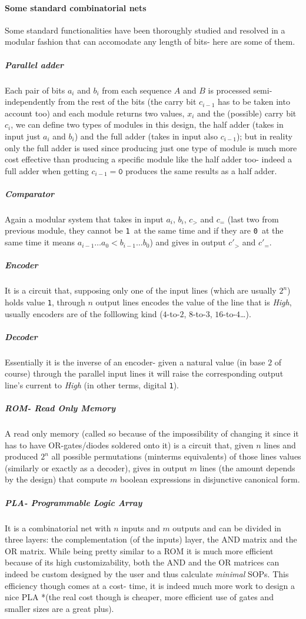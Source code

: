 \documentclass{scrartcl}
\newcommand{\zero}{\texttt{0}}
\newcommand{\one}{\texttt{1}}
\begin{document}
    \paragraph{Some standard combinatorial nets} Some standard functionalities have been thoroughly studied and resolved in a modular fashion that can accomodate any length of bits- here are some of them.
    \subparagraph{Parallel adder} Each pair of bits $a_i$ and $b_i$ from each sequence $A$ and $B$ is processed semi-independently from the rest of the bits (the carry bit $c_{i-1}$ has to be taken into account too) and each module returns two values, $x_i$ and the (possible) carry bit $c_i$, we can define two types of modules in this design, the half adder (takes in input just $a_i$ and $b_i$) and the full adder (takes in input also $c_{i-1}$); but in reality only the full adder is used since producing just one type of module is much more cost effective than producing a specific module like the half adder too- indeed a full adder when getting $c_{i-1}=\zero$ produces the same results as a half adder.
    \subparagraph{Comparator} Again a modular system that takes in input $a_i$, $b_i$, $c_{>}$ and $c_{=}$ (last two from previous module, they cannot be \one\ at the same time and if they are \zero\ at the same time it means $a_{i-1}\dots a_0 < b_{i-1}\dots b_0$) and gives in output $c'_{>}$ and $c'_{=}$.
    \subparagraph{Encoder} It is a circuit that, supposing only one of the input lines (which are usually $2^n$) holds value \one , through $n$ output lines encodes the value of the line that is \emph{High}, usually encoders are of the folllowing kind ($4$-to-$2$, $8$-to-$3$, $16$-to-$4$\dots).
    \subparagraph{Decoder} Essentially it is the inverse of an encoder- given a natural value (in base $2$ of course) through the parallel input lines it will raise the corresponding output line's current to \emph{High} (in other terms, digital \one).
    \subparagraph{ROM- Read Only Memory} A read only memory (called so because of the impossibility of changing it since it has to have OR-gates/diodes soldered onto it) is a circuit that, given $n$ lines and produced $2^n$ all possible permutations (minterms equivalents) of those lines values (similarly or exactly as a decoder), gives in output $m$ lines (the amount depends by the design) that compute $m$ boolean expressions in disjunctive canonical form.
    \subparagraph{PLA- Programmable Logic Array} It is a combinatorial net with $n$ inputs and $m$ outputs and can be divided in three layers: the complementation (of the inputs) layer, the AND matrix and the OR matrix. While being pretty similar to a ROM it is much more efficient because of its high customizability, both the AND and the OR matrices can indeed be custom designed by the user and thus calculate \emph{minimal} SOPs. This efficiency though comes at a cost- time, it is indeed much more work to design a nice PLA *(the real cost though is cheaper, more efficient use of gates and smaller sizes are a great plus).
\end{document}
